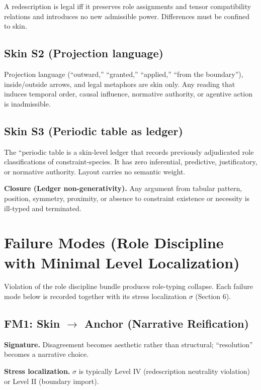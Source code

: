 \documentclass[12pt]{article}
\theoremstyle{plain}
\begin{document}
A redescription is legal iff it preserves role assignments and tensor compatibility relations and introduces no new admissible power. Differences must be confined to skin.

\subsection{Skin S2 (Projection language)}

Projection language (``outward,'' ``granted,'' ``applied,'' ``from the boundary''), inside/outside arrows, and legal metaphors are skin only. Any reading that induces temporal order, causal influence, normative authority, or agentive action is inadmissible.

\subsection{Skin S3 (Periodic table as ledger)}

The ``periodic table is a skin-level ledger that records previously adjudicated role classifications of constraint-species. It has zero inferential, predictive, justificatory, or normative authority. Layout carries no semantic weight.

\textbf{Closure (Ledger non-generativity).} Any argument from tabular pattern, position, symmetry, proximity, or absence to constraint existence or necessity is ill-typed and terminated.

\section{Failure Modes (Role Discipline with Minimal Level Localization)}

Violation of the role discipline bundle produces role-typing collapse. Each failure mode below is recorded together with its stress localization $\sigma$ (Section 6).

\subsection{FM1: Skin \texorpdfstring{$\rightarrow$}{->} Anchor (Narrative Reification)}

\textbf{Signature.} Disagreement becomes aesthetic rather than structural; ``resolution'' becomes a narrative choice.

\textbf{Stress localization.} $\sigma$ is typically Level IV (redescription neutrality violation) or Level II (boundary import).
\end{document}
